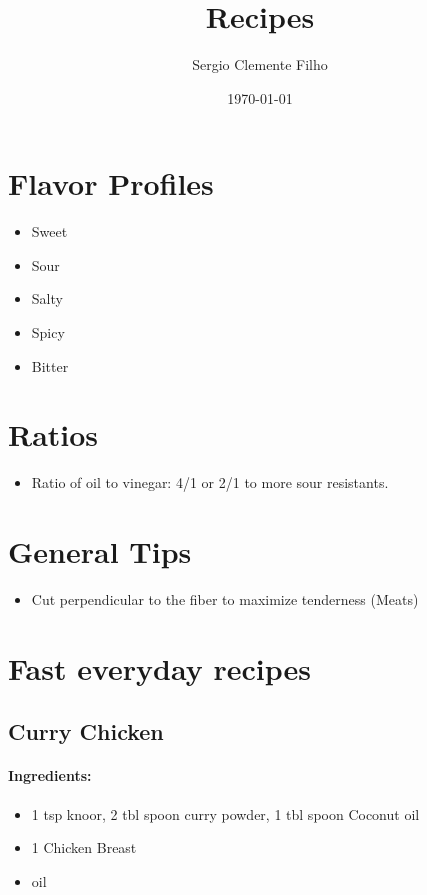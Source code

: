 \documentclass{article}
\title{Recipes}
\author{Sergio Clemente Filho}
\date{\today}
\begin{document}
\maketitle

\newpage

\tableofcontents{}

\newpage

\section{Flavor Profiles}
\begin{itemize}
	\item Sweet
	\item Sour
	\item Salty
	\item Spicy
	\item Bitter
\end{itemize}

	\section{Ratios}
\begin{itemize}
	\item Ratio of oil to vinegar: 4/1 or 2/1 to more sour resistants.
\end{itemize}

\section{General Tips}
\begin{itemize}
	\item Cut perpendicular to the fiber to maximize tenderness (Meats)
\end{itemize}






\section{Fast everyday recipes}


\subsection{Curry Chicken}

\paragraph{Ingredients:}
\begin{itemize}
    \item 1 tsp knoor, 2 tbl spoon curry powder, 1 tbl spoon Coconut oil
    \item 1 Chicken Breast
    \item oil
\end{itemize}
\end{document}
